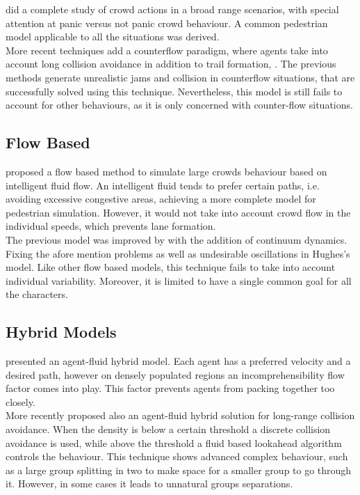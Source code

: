 \documentclass[6pt]{article} %
\begin{document}
\begin{multicols}{2}
\cite{helbing2002} did a complete study of crowd actions in a broad range scenarios, with special attention at panic versus not panic crowd behaviour.
A common pedestrian model applicable to all the situations was derived.\\

More recent techniques add a counterflow paradigm, where agents take into account long collision avoidance in addition to trail formation, \cite{heliovaara2012}.
The previous methods generate unrealistic jams and collision in counterflow situations, that are successfully solved using this technique.
Nevertheless, this model is still fails to account for other behaviours, as it is only concerned with counter-flow situations.

\subsection{Flow Based}

\cite{hughes2003} proposed a flow based method to simulate large crowds behaviour based on intelligent fluid flow.
An intelligent fluid tends to prefer certain paths, i.e. avoiding excessive congestive areas, achieving a more complete model for pedestrian simulation.
However, it would not take into account crowd flow in the individual speeds, which prevents lane formation.\\

The previous model was improved by \cite{treuille2006} with the addition of continuum dynamics.
Fixing the afore mention problems as well as undesirable oscillations in Hughes's model.
Like other flow based models, this technique fails to take into account individual variability.
Moreover, it is limited to have a single common goal for all the characters.

\subsection{Hybrid Models}

\cite{Narain2009} presented an agent-fluid hybrid model.
Each agent has a preferred velocity and a desired path, however on densely populated regions an incomprehensibility flow factor comes into play.
This factor prevents agents from packing together too closely.\\

More recently \cite{lin2014} proposed also an agent-fluid hybrid solution for long-range collision avoidance.
When the density is below a certain threshold a discrete collision avoidance is used,
while above the threshold a fluid based lookahead algorithm controls the behaviour.
This technique shows advanced complex behaviour, such as a large group splitting in two to make space for a smaller group to go through it.
However, in some cases it leads to unnatural groups separations.


\end{multicols}
\end{document}
